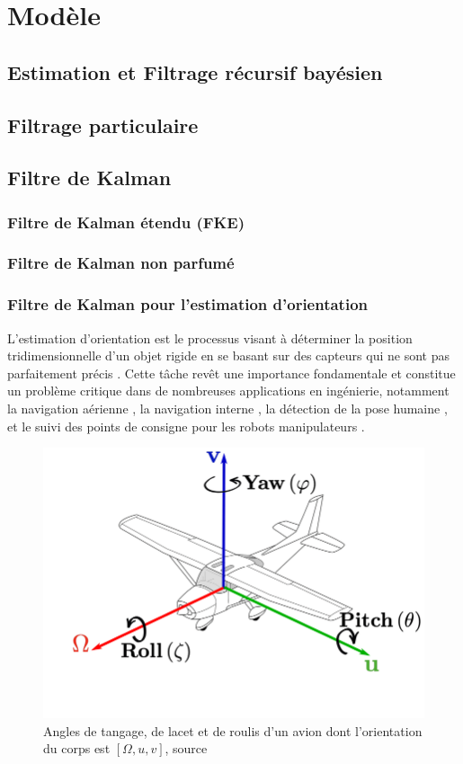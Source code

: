 \documentclass[5pt]{article}
\begin{document}
 \newpage
\section{Modèle}
\label{modèle}
\subsection{Estimation et Filtrage récursif bayésien}
\subsection{Filtrage particulaire}
\subsection{Filtre de Kalman}
\subsubsection{Filtre de Kalman étendu (FKE)}
\subsubsection{Filtre de Kalman non parfumé }
\subsubsection{Filtre de Kalman pour l'estimation d'orientation}
\label{subsubsec:yrp}

L'estimation d'orientation est le processus visant à déterminer la position tridimensionnelle d'un objet rigide en se basant sur des capteurs qui ne sont pas parfaitement précis . Cette tâche revêt une importance fondamentale et constitue un problème critique dans de nombreuses applications en ingénierie, notamment la navigation aérienne \cite{dai_navigation_2019}, la navigation interne \cite{santos_indoor_2015}, la détection de la pose humaine \cite{severin_head_2020}, et le suivi des points de consigne pour les robots manipulateurs \cite{ogata_robust_2019}.
\begin{figure}[H]
    \centering
    \includegraphics[width=0.5\linewidth]{../ypr.png}
    \caption{ Angles de tangage, de lacet et de roulis d'un avion dont l'orientation du corps est $[\Omega, u, v]$, source \cite{noauthor_figure_nodate}} 
    \label{fig:attitude}

\end{figure}
\end{document}
